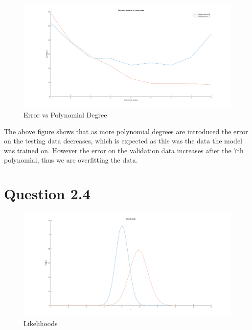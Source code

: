 \begin{figure}[H]
    \includegraphics[width=\linewidth]{../../pracs/week3/images/q1_err_vs_degree}
    \centering
    \caption{Error vs Polynomial Degree}
\end{figure}

The above figure shows that as more polynomial degrees are introduced the error on the testing data decreases, which is expected as this was the data the model was trained on. However the error on the validation data increases after the 7th polynomial, thus we are overfitting the data.

\section*{Question 2.4}



\begin{figure}[H]
    \includegraphics[width=\linewidth]{../../pracs/week3/images/q4_likelihoods}
    \centering
    \caption{Likelihoods}
\end{figure}

